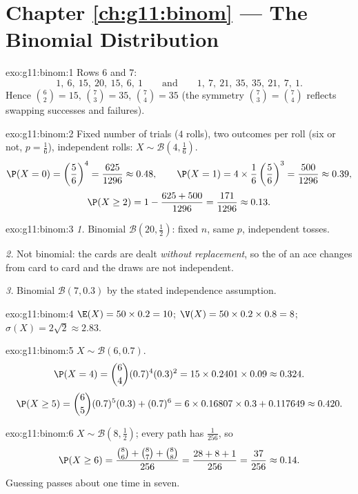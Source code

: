 \section*{Chapter \ref{ch:g11:binom} --- The Binomial Distribution}

\begin{solution}{exo:g11:binom:1}
Rows $6$ and $7$:
\[
1,\ 6,\ 15,\ 20,\ 15,\ 6,\ 1
\qquad\text{and}\qquad
1,\ 7,\ 21,\ 35,\ 35,\ 21,\ 7,\ 1 .
\]
Hence $\binom62 = 15$, $\binom73 = 35$, $\binom74 = 35$ (the symmetry
$\binom73 = \binom74$ reflects swapping successes and failures).
\end{solution}

\begin{solution}{exo:g11:binom:2}
Fixed number of trials ($4$ rolls), two outcomes per roll (six or not,
$p = \frac16$), independent rolls: $X \sim \mathcal B(4, \frac16)$.
\[
\P(X=0) = \left(\frac56\right)^4 = \frac{625}{1296} \approx 0.48,
\qquad
\P(X=1) = 4 \times \frac16\left(\frac56\right)^3 = \frac{500}{1296}
\approx 0.39,
\]
\[
\P(X \geq 2) = 1 - \frac{625 + 500}{1296} = \frac{171}{1296}
\approx 0.13 .
\]
\end{solution}

\begin{solution}{exo:g11:binom:3}
\emph{1.} Binomial $\mathcal B(20, \frac12)$: fixed $n$, same $p$,
independent tosses.

\emph{2.} Not binomial: the cards are dealt \emph{without replacement},
so the  of an ace changes from card to card and the draws are
not independent.

\emph{3.} Binomial $\mathcal B(7, 0.3)$ by the stated independence
assumption.
\end{solution}

\begin{solution}{exo:g11:binom:4}
$\E(X) = 50 \times 0.2 = 10$;
$\V(X) = 50 \times 0.2 \times 0.8 = 8$;
$\sigma(X) = 2\sqrt2 \approx 2.83$.
\end{solution}

\begin{solution}{exo:g11:binom:5}
$X \sim \mathcal B(6, 0.7)$.
\[
\P(X = 4) = \binom64 (0.7)^4 (0.3)^2 = 15 \times 0.2401 \times 0.09
\approx 0.324 .
\]
\[
\P(X \geq 5) = \binom65 (0.7)^5(0.3) + (0.7)^6
= 6 \times 0.16807 \times 0.3 + 0.117649 \approx 0.420 .
\]
\end{solution}

\begin{solution}{exo:g11:binom:6}
$X \sim \mathcal B\left(8, \frac12\right)$; every path has 
$\frac{1}{256}$, so
\[
\P(X \geq 6) = \frac{\binom86 + \binom87 + \binom88}{256}
= \frac{28 + 8 + 1}{256} = \frac{37}{256} \approx 0.14 .
\]
Guessing passes about one time in seven.
\end{solution}

